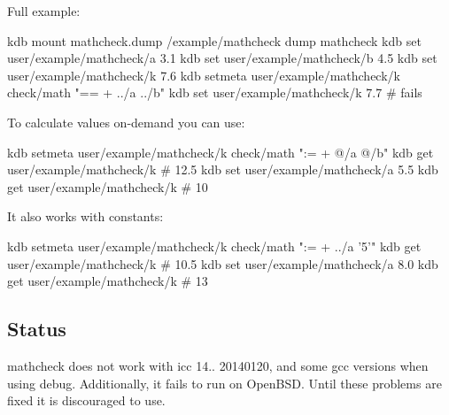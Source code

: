 Full example\+: \begin{DoxyVerb}    kdb mount mathcheck.dump /example/mathcheck dump mathcheck
    kdb set user/example/mathcheck/a 3.1
    kdb set user/example/mathcheck/b 4.5
    kdb set user/example/mathcheck/k 7.6
    kdb setmeta user/example/mathcheck/k check/math "== + ../a ../b"
    kdb set user/example/mathcheck/k 7.7   # fails
\end{DoxyVerb}


To calculate values on-\/demand you can use\+: \begin{DoxyVerb}    kdb setmeta user/example/mathcheck/k check/math ":= + @/a @/b"
    kdb get user/example/mathcheck/k       # 12.5
    kdb set user/example/mathcheck/a 5.5
    kdb get user/example/mathcheck/k       # 10
\end{DoxyVerb}


It also works with constants\+: \begin{DoxyVerb}    kdb setmeta user/example/mathcheck/k check/math ":= + ../a '5'"
    kdb get user/example/mathcheck/k       # 10.5
    kdb set user/example/mathcheck/a 8.0
    kdb get user/example/mathcheck/k       # 13
\end{DoxyVerb}


\subsection*{Status}

mathcheck does not work with icc 14.. 20140120, and some gcc versions when using debug. Additionally, it fails to run on Open\+B\+S\+D. Until these problems are fixed it is discouraged to use. 